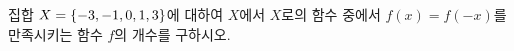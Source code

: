 집합 $X=\{-3{,}\mkern3mu\mathopen{}-1{,}\mkern3mu\mathopen{}0{,}\mkern3mu\mathopen{}1{,}\mkern3mu\mathopen{}3\}$에 대하여 $X$에서 $X$로의 함수 중에서 $f(x)=f(-x)$를 만족시키는 함수 $f$의 개수를 구하시오.
